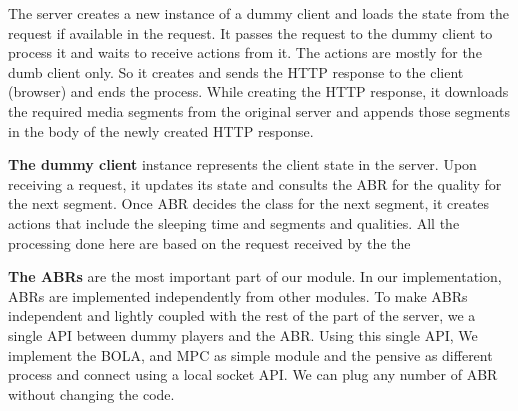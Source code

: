The server creates a new instance of a dummy client and loads the state from the request if available in the request. It passes the request to the dummy client to process it and waits to receive actions from it. The actions are mostly for the dumb client only. So it creates and sends the HTTP response to the client (\ie browser) and ends the process. While creating the HTTP response, it downloads the required media segments from the original server and appends those segments in the body of the newly created HTTP response.

{\bf The dummy client} instance represents the client state in the server. Upon receiving a request, it updates its state and consults the ABR for the quality for the next segment. Once ABR decides the class for the next segment, it creates actions that include the sleeping time and segments and qualities. All the processing done here are based on the request received by the the 

{\bf The ABRs} are the most important part of our module. In our implementation, ABRs are implemented independently from other modules. To make ABRs independent and lightly coupled with the rest of the part of the server, we a single API between dummy players and the ABR.  Using this single API, We implement the BOLA, and MPC as simple \python module and the pensive as different process and connect using a local socket API. We can plug any number of ABR without changing the code.


